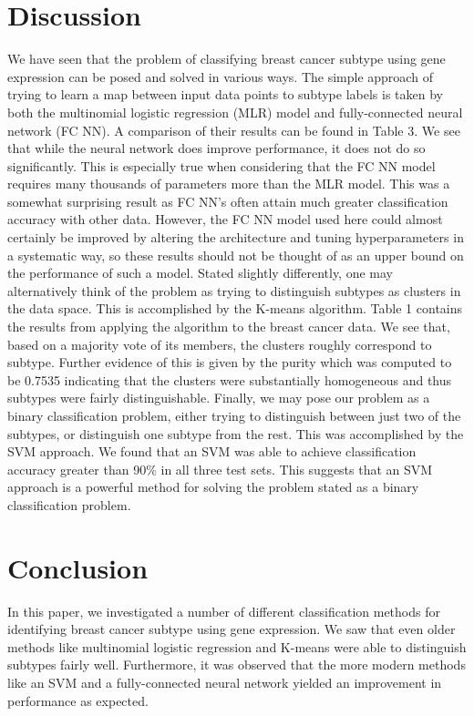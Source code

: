 \documentclass{article}
\begin{document}
\section{Discussion}
We have seen that the problem of classifying breast cancer subtype using gene expression can be posed and solved in various ways. The simple approach of trying to learn a map between input data points to subtype labels is taken by both the multinomial logistic regression (MLR) model and fully-connected neural network (FC NN). A comparison of their results can be found in Table 3. We see that while the neural network does improve performance, it does not do so significantly. This is especially true when considering that the FC NN model requires many thousands of parameters more than the MLR model. This was a somewhat surprising result as FC NN's often attain much greater classification accuracy with other data. However, the FC NN model used here could almost certainly be improved by altering the architecture and tuning hyperparameters in a systematic way, so these results should not be thought of as an upper bound on the performance of such a model.
\newline\newline Stated slightly differently, one may alternatively think of the problem as trying to distinguish subtypes as clusters in the data space. This is accomplished by the K-means algorithm. Table 1 contains the results from applying the algorithm to the breast cancer data. We see that, based on a majority vote of its members, the clusters roughly correspond to subtype. Further evidence of this is given by the purity which was computed to be 0.7535 indicating that the clusters were substantially homogeneous and thus subtypes were fairly distinguishable.
\newline\newline Finally, we may pose our problem as a binary classification problem, either trying to distinguish between just two of the subtypes, or distinguish one subtype from the rest. This was accomplished by the SVM approach. We found that an SVM was able to achieve classification accuracy greater than 90\% in all three test sets. This suggests that an SVM approach is a powerful method for solving the problem stated as a binary classification problem.

\section{Conclusion}
In this paper, we investigated a number of different classification methods for identifying breast cancer subtype using gene expression. We saw that even older methods like multinomial logistic regression and K-means were able to distinguish subtypes fairly well. Furthermore, it was observed that the more modern methods like an SVM and a fully-connected neural network yielded an improvement in performance as expected.
\end{document}
